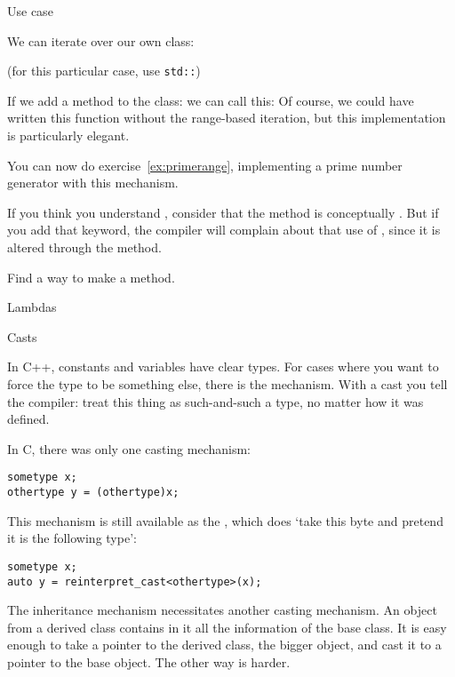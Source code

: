 \begin{block}{Use case}
  \label{sl:bagfind}

  We can iterate over our own class:

  (for this particular case, use \lstinline{std::})
\end{block}

If we add a method  to the class:
%
%
we can call this:
%
%
Of course, we could have written this function
without the range-based iteration, but this implementation is
particularly elegant.

\begin{exercise}
  You can now do exercise~\ref{ex:primerange}, implementing a prime
  number generator with this mechanism.
\end{exercise}

If you think you understand , consider that the 
method is conceptually . But if you add that keyword, the
compiler will complain about that use of , since it is
altered through the  method.

\begin{exercise}
  \label{ex:rangeconstiter}
  Find a way to make  a  method.
\end{exercise}

 {Lambdas}
\label{sec:lambda}


 {Casts}
\label{sec:cast}

In C++, constants and variables have clear types. For cases where you
want to force the type to be something else, there is the
 mechanism. With a cast you tell the compiler:
treat this thing as such-and-such a type, no matter how it was
defined.

In C, there was only one casting mechanism:
\begin{lstlisting}
sometype x;
othertype y = (othertype)x;
\end{lstlisting}
This mechanism is still available as the
, which does `take this byte and pretend
it is the following type':
\begin{lstlisting}
sometype x;
auto y = reinterpret_cast<othertype>(x);
\end{lstlisting}

The inheritance mechanism necessitates another casting mechanism.
An object from a derived class contains in it all the information of
the base class. It is easy enough to take a pointer to the derived
class, the bigger object, and cast it to a pointer to the base object.
The other way is harder.

